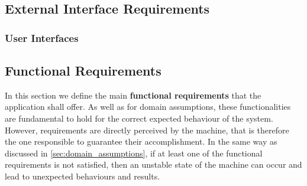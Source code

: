 \subsection{External Interface Requirements}
\subsubsection{User Interfaces}



\subsection{Functional Requirements}
In this section we define the main \textbf{functional requirements} that the application shall offer. As well as for domain assumptions, these functionalities are fundamental to hold for the correct expected behaviour of the system. However, requirements are directly perceived by the machine, that is therefore the one responsible to guarantee their accomplishment. In the same way as discussed in \ref{sec:domain_assumptions}, if at least one of the functional requirements is not satisfied, then an unstable state of the machine can occur and lead to unexpected behaviours and results.
\newline\newline
{}

